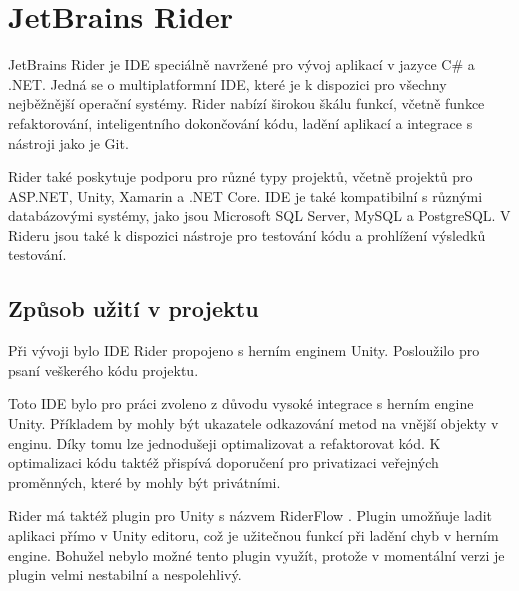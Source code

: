 \section{JetBrains Rider}

JetBrains Rider je IDE speciálně navržené pro vývoj aplikací v jazyce C\# a .NET. Jedná se o multiplatformní IDE, které je k dispozici pro všechny nejběžnější operační systémy.
Rider nabízí širokou škálu funkcí, včetně funkce refaktorování, inteligentního dokončování kódu, ladění aplikací a integrace s nástroji jako je Git. \cite{rider}

Rider také poskytuje podporu pro různé typy projektů, včetně projektů pro ASP.NET, Unity, Xamarin a .NET Core. IDE je také kompatibilní s různými databázovými systémy, jako jsou Microsoft SQL Server, MySQL a PostgreSQL.
V Rideru jsou také k dispozici nástroje pro testování kódu a prohlížení výsledků testování.

\subsection{Způsob užití v projektu}

Při vývoji bylo IDE Rider propojeno s herním enginem Unity. Posloužilo pro psaní veškerého kódu projektu.

Toto IDE bylo pro práci zvoleno z důvodu vysoké integrace s herním engine Unity. Příkladem by mohly být ukazatele odkazování metod na vnější objekty v enginu. Díky tomu lze jednodušeji optimalizovat a refaktorovat kód. K optimalizaci kódu taktéž přispívá doporučení pro privatizaci veřejných proměnných, které by mohly být privátními.

Rider má taktéž plugin pro Unity s názvem RiderFlow \cite{riderflow}. Plugin umožňuje ladit aplikaci přímo v Unity editoru, což je užitečnou funkcí při ladění chyb v herním engine. Bohužel nebylo možné tento plugin využít, protože v momentální verzi je plugin velmi nestabilní a nespolehlivý.
